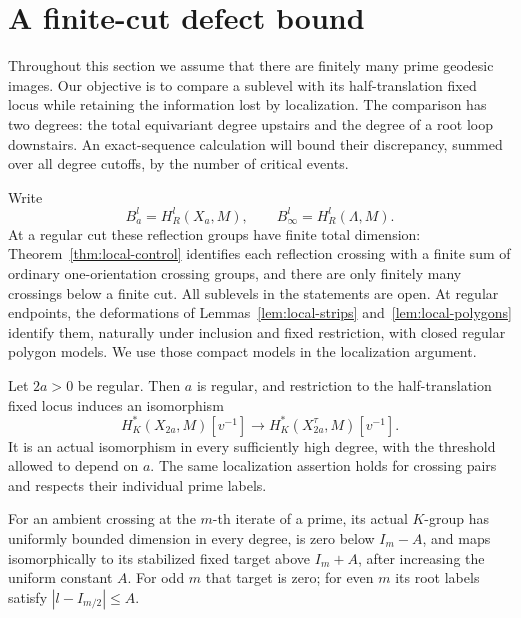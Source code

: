 \section{A finite-cut defect bound}\label{sec:budget}

Throughout this section we assume that there are finitely many prime
geodesic images. Our objective is to compare a sublevel with its
half-translation fixed locus while retaining the information lost by
localization. The comparison has two degrees: the total equivariant
degree upstairs and the degree of a root loop downstairs. An exact-sequence
calculation will bound their discrepancy, summed over all degree cutoffs,
by the number of critical events.

Write
\[
 B_a^l=H_R^l(X_a,M),\qquad
 B_\infty^l=H_R^l(\Lambda,M).
\]
At a regular cut these reflection groups have finite total dimension:
Theorem~\ref{thm:local-control} identifies each reflection crossing with
a finite sum of ordinary one-orientation crossing groups, and there are
only finitely many crossings below a finite cut. All sublevels in the
statements are open. At regular endpoints, the deformations of
Lemmas~\ref{lem:local-strips} and~\ref{lem:local-polygons} identify them, naturally
under inclusion and fixed restriction, with closed regular polygon
models. We use those compact models in the localization argument.

\begin{lemma}\label{bud:localization}
Let $2a>0$ be regular. Then $a$ is regular, and restriction to the
half-translation fixed locus induces an isomorphism
\[
 H_K^*(X_{2a},M)[v^{-1}]
 \longrightarrow H_K^*(X_{2a}^{\tau},M)[v^{-1}].
\]
It is an actual isomorphism in every sufficiently high degree, with the
threshold allowed to depend on $a$. The same localization assertion
holds for crossing pairs and respects their individual prime labels.

For an ambient crossing at the $m$-th iterate of a prime, its actual
$K$-group has uniformly bounded dimension in every degree, is zero below
$I_m-A$, and maps isomorphically to its stabilized fixed target above
$I_m+A$, after increasing the uniform constant $A$. For odd $m$ that
target is zero; for even $m$ its root labels satisfy
$|l-I_{m/2}|\le A$.
\end{lemma}

